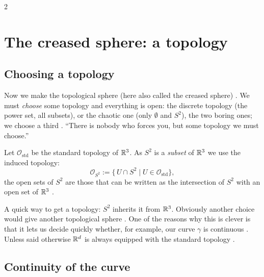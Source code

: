 \begin{paracol}{2}
\section{The creased sphere: a topology}\label{sec:sp-topological}

\subsection{Choosing a topology}

Now we make the topological sphere (here also called the creased sphere) . We must \emph{choose} some topology
and everything is open: the discrete topology (the power set, all subsets), or the chaotic one (only $\emptyset$ and $S^2$), the two
boring ones; we choose a third . ``There is nobody who forces you, but some topology we must choose.''

\begin{definition}\label{def:sp-induced}
Let $\mathcal O_{\text{std}}$ be the standard topology of $\mathbb{R}^3$. As $S^2$ is a \emph{subset} of $\mathbb{R}^3$ we use the induced topology:
\[
  \mathcal O_{S^2}:=\bigl\{\,U\cap S^2\;\big|\;U\in\mathcal O_{\text{std}}\bigr\},
\]
the open sets of $S^2$ are those that can be written as the intersection of $S^2$ with an open set of $\mathbb{R}^3$ .
\end{definition}
A quick way to get a topology: $S^2$ inherits it from $\mathbb{R}^3$. Obviously another choice would give another topological sphere
. One of the reasons why this is clever is that it lets us decide quickly whether, for example, our curve $\gamma$ is
continuous . Unless said otherwise $\mathbb{R}^d$ is always equipped with the standard topology .

\subsection{Continuity of the curve}


\end{paracol}
